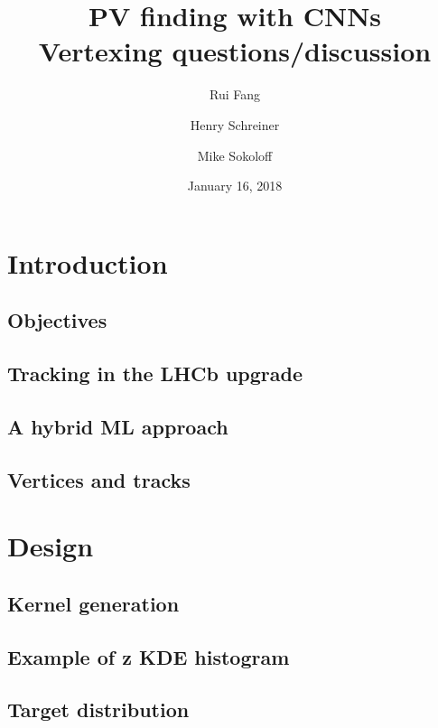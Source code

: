 \documentclass[aspectratio=169, 10pt]{beamer}
\title[PV finding with CNNs: Vertexing questions/discussion]{PV finding with CNNs\\{\small Vertexing questions/discussion}}
\author[Fang, Schreiner, Sokoloff]{Rui Fang \and Henry Schreiner \and Mike Sokoloff}
\institute{The University of Cincinnati}
\date{January 16, 2018}
\begin{document}
\begin{frame}
\titlepage
\end{frame}


\section{Introduction}

\subsection{Objectives}


\subsection{Tracking in the LHCb upgrade}


\subsection{A hybrid ML approach}


\subsection{Vertices and tracks}



\section{Design}

\subsection{Kernel generation}


\subsection{Example of z KDE histogram}


\subsection{Target distribution}

\end{document}
